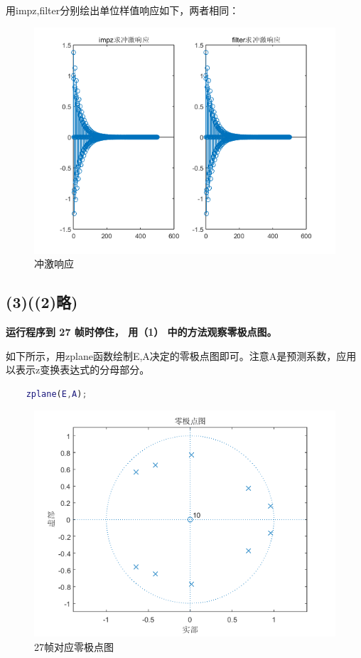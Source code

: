 \documentclass[10pt]{article}
\begin{document}
用impz,filter分别绘出单位样值响应如下，两者相同：
\begin{figure}[h]
	\centering
	\begin{minipage}{0.49\linewidth}
		\centering
		\includegraphics[width=0.9\linewidth]{drawing1-3.png}
		\caption{冲激响应}
	\end{minipage}
\end{figure}
\newpage
\subsection*{(3)((2)略)}
\textbf{\color{gray}运行程序到 27 帧时停住， 用（1） 中的方法观察零极点图。}

如下所示，用zplane函数绘制E,A决定的零极点图即可。注意A是预测系数，应用以表示z变换表达式的分母部分。
\begin{lstlisting}[language=matlab]
% (3) 在此位置写程序，观察预测系统的零极点图
    zplane(E,A);
    \end{lstlisting}

\begin{figure}[h]
	\centering
	\begin{minipage}{0.49\linewidth}
		\centering
		\includegraphics[width=0.9\linewidth]{coding1.png}
		\caption{27帧对应零极点图}
	\end{minipage}
\end{figure}
\end{document}
